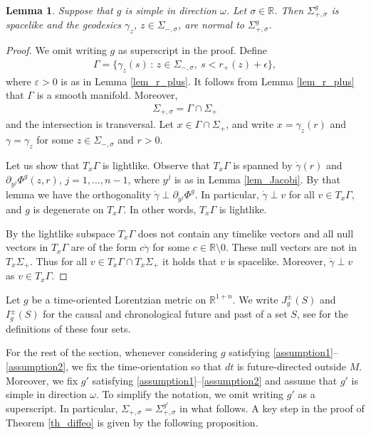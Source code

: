 \documentclass[11pt,letterpaper]{amsart}
\newtheorem{Lemma}[Theorem]{Lemma}
\theoremstyle{definition}
\numberwithin{equation}{section}
\newcommand{\eps}{\varepsilon}
\newcommand{\p}{\partial}
\def\p{\partial}
\def\R{\mathbb R}
\def\mid{\,:\,}
\begin{document}
\begin{Lemma}\label{lem_Sigma_splike}
Suppose that $g$ is simple in direction $\omega$. Let $\sigma \in \R$. Then $\Sigma_{+,\sigma}^g$ is spacelike
and the geodesics $\gamma_z$, $z \in \Sigma_{-,\sigma}$, are normal to $\Sigma_{+,\sigma}^g$.
\end{Lemma}
\begin{proof}
We omit writing $g$ as superscript in the proof. 
Define
    \begin{align*}
\Gamma = \{\gamma_z(s) \mid z \in \Sigma_{-, \sigma},\ s < r_+(z) + \epsilon\},
    \end{align*}
where $\eps > 0$ is as in Lemma \ref{lem_r_plus}. 
It follows from Lemma \ref{lem_r_plus} that $\Gamma$ is a smooth manifold. 
Moreover, 
    \begin{align*}
\Sigma_{+,\sigma} = \Gamma \cap \Sigma_+
    \end{align*}
and the intersection is transversal.
Let $x \in \Gamma \cap \Sigma_+$,  and write $x = \gamma_z(r)$ and $\gamma = \gamma_z$ for some $z \in \Sigma_{-, \sigma}$ and $r > 0$. 

Let us show that $T_x \Gamma$ is lightlike. Observe that $T_x \Gamma$ is spanned by $\dot \gamma(r)$ and $\p_{y^j} \Phi^g(z, r)$, $j=1,\dots,n-1$, where $y^j$ is as in Lemma \ref{lem_Jacobi}. By that lemma we have the orthogonality $\dot \gamma \perp \p_{y^j} \Phi^g$. In particular, $\dot \gamma \perp v$ for all $v \in T_x \Gamma$, and $g$ is degenerate on $T_x \Gamma$. In other words, $T_x \Gamma$ is lightlike.

By \cite[Lemma 28, p.\ 142]{oneill1983} the lightlike subspace $T_x \Gamma$ does not contain any timelike vectors and all null vectors in $T_x \Gamma$ are of the form $c \dot \gamma$ for some $c \in \R \setminus 0$. These null vectors are not in $T_x \Sigma_+$. Thus for all $v \in T_x \Gamma \cap T_x \Sigma_+$ it holds that $v$ is spacelike. Moreover, $\dot \gamma \perp v$ as $v \in T_x \Gamma$.
\end{proof}

Let $g$ be a time-oriented Lorentzian metric on $\R^{1+n}$.
We write $J^\pm_g(S)$ and $I^\pm_g(S)$ for the causal and chronological future and past of a set $S$, see \cite[p.\ 402]{oneill1983} for the definitions of these four sets.

For the rest of the section, whenever considering $g$ satisfying \eqref{assumption1}--\eqref{assumption2}, we fix the time-orientation so that $dt$ is future-directed outside $M$. Moreover, we fix $g'$ satisfying \eqref{assumption1}--\eqref{assumption2} and assume that $g'$ is simple in direction $\omega$. To simplify the notation, we omit writing $g'$ as a superscript. In particular, $\Sigma_{+,\sigma} = \Sigma_{+,\sigma}^{g'}$ in what follows. A key step in the proof of Theorem \ref{th_diffeo} is given by the following proposition.
\end{document}
